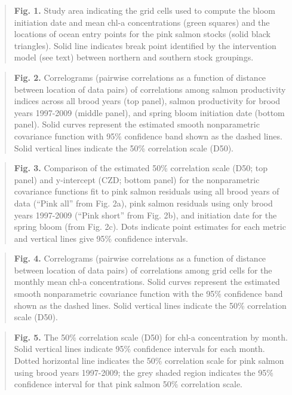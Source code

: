 \begin{quote}
\textbf{Fig. 1.} Study area indicating the grid cells used to compute
the bloom initiation date and mean chl-a concentrations (green squares)
and the locations of ocean entry points for the pink salmon stocks
(solid black triangles). Solid line indicates break point identified by
the intervention model (see text) between northern and southern stock
groupings.
\end{quote}

\begin{quote}
\textbf{Fig. 2.} Correlograms (pairwise correlations as a function of
distance between location of data pairs) of correlations among salmon
productivity indices across all brood years (top panel), salmon
productivity for brood years 1997-2009 (middle panel), and spring bloom
initiation date (bottom panel). Solid curves represent the estimated
smooth nonparametric covariance function with 95\% confidence band shown
as the dashed lines. Solid vertical lines indicate the 50\% correlation
scale (D50).
\end{quote}

\begin{quote}
\textbf{Fig. 3.} Comparison of the estimated 50\% correlation scale
(D50; top panel) and y-intercept (CZD; bottom panel) for the
nonparametric covariance functions fit to pink salmon residuals using
all brood years of data (``Pink all'' from Fig. 2a), pink salmon
residuals using only brood years 1997-2009 (``Pink short'' from Fig.
2b), and initiation date for the spring bloom (from Fig. 2c). Dots
indicate point estimates for each metric and vertical lines give 95\%
confidence intervals.
\end{quote}

\begin{quote}
\textbf{Fig. 4.} Correlograms (pairwise correlations as a function of
distance between location of data pairs) of correlations among grid
cells for the monthly mean chl-a concentrations. Solid curves represent
the estimated smooth nonparametric covariance function with the 95\%
confidence band shown as the dashed lines. Solid vertical lines indicate
the 50\% correlation scale (D50).
\end{quote}

\begin{quote}
\textbf{Fig. 5.} The 50\% correlation scale (D50) for chl-a
concentration by month. Solid vertical lines indicate 95\% confidence
intervals for each month. Dotted horizontal line indicates the 50\%
correlation scale for pink salmon using brood years 1997-2009; the grey
shaded region indicates the 95\% confidence interval for that pink
salmon 50\% correlation scale.
\end{quote}

